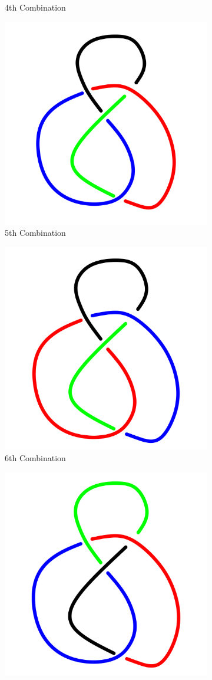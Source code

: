 \documentclass[a4paper,9pt]{article}
\begin{document}
\begin{enumerate}
\begin{figure}[h!]
\begin{subfigure}[b]{0.25\linewidth}
		\caption{4th Combination}
	\end{subfigure}
\qquad
\begin{subfigure}[b]{0.25\linewidth}
	\centering
	\includegraphics[width=0.5\linewidth]{picture/knotpict/knot-5}
	\caption{5th Combination}
\end{subfigure}
\qquad
\begin{subfigure}[b]{0.25\linewidth}
	\centering
	\includegraphics[width=0.5\linewidth]{picture/knotpict/knot-6}
	\caption{6th Combination}
\end{subfigure}
\qquad
\begin{subfigure}[b]{0.25\linewidth}
	\centering
	\includegraphics[width=0.5\linewidth]{picture/knotpict/knot-7}

\end{subfigure}
\end{figure}
\end{enumerate}
\end{document}
